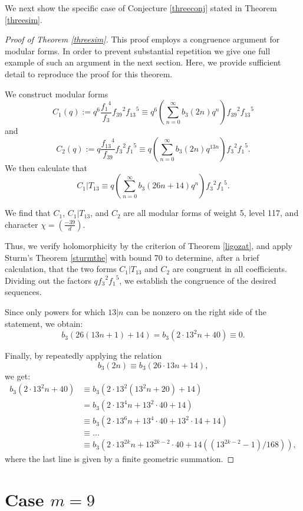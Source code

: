 \documentclass[12pt]{amsart}
\theoremstyle{definition}
\begin{document}
We next show the specific case of Conjecture \ref{threeconj} stated in Theorem \ref{threesim}.

\begin{proof}[Proof of Theorem \ref{threesim}] This proof employs a congruence argument for modular forms.  In order to prevent substantial repetition we give one full example of such an argument in the next section.  Here, we provide sufficient detail to reproduce the proof for this theorem.

We construct modular forms $$C_1(q) := q^6 \frac{{f_1}^4}{f_3} {f_{39}}^2 {f_{13}}^5 \equiv q^6 \left( \sum_{n=0}^\infty b_3(2n) q^n \right) {f_{39}}^2 {f_{13}}^5$$ and $$C_2(q) := q \frac{{f_{13}}^4}{f_{39}} {f_3}^2 {f_1}^5 \equiv q \left( \sum_{n=0}^\infty b_3(2n) q^{13n} \right) {f_3}^2 {f_1}^5.$$  We then calculate that $$C_1 \vert T_{13} \equiv q \left( \sum_{n=0}^\infty b_3(26n+14) q^n \right) {f_3}^2 {f_1}^5 .$$

We find that $C_1$, $C_1 \vert T_{13}$, and $C_2$ are all modular forms of weight 5, level 117, and character $\chi = \left( \frac{-39}{d} \right)$.  

Thus, we verify holomorphicity by the criterion of Theorem \ref{ligozat}, and apply Sturm's Theorem \ref{sturmthe} with bound 70 to determine, after a brief calculation, that the two forms $C_1 \vert T_{13}$ and $C_2$ are congruent in all coefficients.  Dividing out the factors $q {f_3}^2 {f_1}^5$, we establish the congruence of the desired sequences.

Since only powers for which $13 \vert n$ can be nonzero on the right side of the statement, we obtain: $$b_3(26(13n+1) + 14) = b_3(2 \cdot 13^2 n + 40) \equiv 0.$$

Finally, by repeatedly applying the relation $$b_3(2n) \equiv b_3(26 \cdot 13n + 14),$$
we get:
\begin{align*} b_3(2 \cdot 13^2 n + 40) &\equiv b_3(2\cdot 13^2(13^2n+20) + 14) \\
 &= b_3(2 \cdot 13^4 n +  13^2 \cdot 40 + 14) \\
 &\equiv b_3(2 \cdot 13^6 n + 13^4 \cdot 40 + 13^2 \cdot 14 + 14) \\
 &\equiv ... \\
 &\equiv b_3 \left(2 \cdot 13^{2k} n + 13^{2k-2}\cdot 40 + 14 ((13^{2k-2} - 1)/168) \right),
\end{align*}
where the last line is given by a finite geometric summation.
\end{proof}

\section{Case $m=9$}\label{ninesec}
\end{document}
